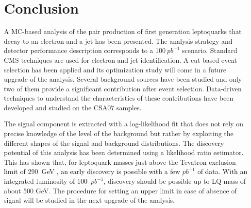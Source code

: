 %

\section{Conclusion}

A MC-based analysis of the pair production of first generation leptoquarks that decay to
an electron and a jet has been presented.
The analysis strategy and detector performance description corresponds to a 100$~pb^{-1}$ scenario.
Standard CMS techniques are used for electron and jet identification. 
A cut-based event selection has been applied and its optimization study will come in a future upgrade
of the analysis.
Several background sources have been studied and only two of them provide a significant contribution
after event selection. 
Data-driven techniques to understand the characteristics of these contributions have been developed 
and studied on the CSA07 samples.

The signal component is extracted with a log-likelihood fit that does not rely on precise knowledge
of the level of the background but rather by exploiting the different shapes of the signal and background
distributions. 
The discovery potential of this analysis has been determined using a likelihood ratio estimator. 
This has shown that, for leptoquark masses just above the Tevatron exclusion limit of 290~GeV
\cite{d02008}, an early discovery is possible with a few $pb^{-1}$ of data.
With an integrated luminosity of 100~$pb^{-1}$, discovery should be possible up
to LQ mass of about 500 GeV.
The procedure for setting an upper limit in case of absence of signal will be studied 
in the next upgrade of the analysis.






%
